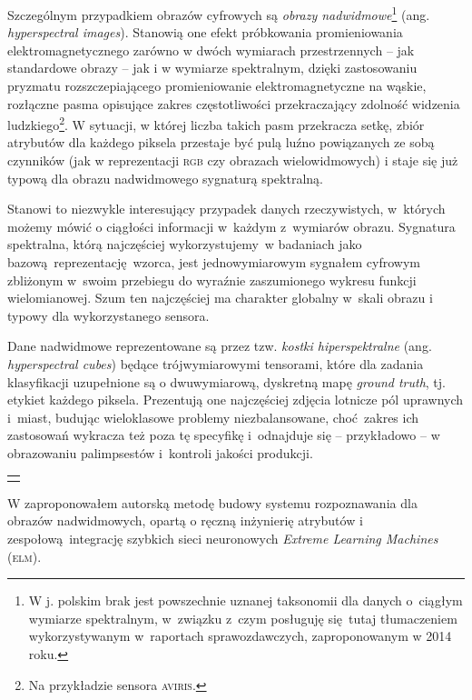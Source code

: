 Szczególnym przypadkiem obrazów cyfrowych są \emph{obrazy nadwidmowe}\footnote{W j. polskim brak jest powszechnie uznanej taksonomii dla danych o~ciągłym wymiarze spektralnym, w~związku z~czym posługuję się tutaj tłumaczeniem wykorzystywanym w~raportach sprawozdawczych, zaproponowanym w 2014 roku.} (ang. \emph{hyperspectral images}). Stanowią one efekt próbkowania promieniowania elektromagnetycznego zarówno w dwóch wymiarach przestrzennych -- jak standardowe obrazy -- jak i w wymiarze spektralnym, dzięki zastosowaniu pryzmatu rozszczepiającego promieniowanie elektromagnetyczne na wąskie, rozłączne pasma opisujące zakres częstotliwości przekraczający zdolność widzenia ludzkiego\footnote{Na przykładzie sensora \textsc{aviris}.}. W sytuacji, w której liczba takich pasm przekracza setkę, zbiór atrybutów dla każdego piksela przestaje być pulą luźno powiązanych ze sobą czynników (jak w reprezentacji \textsc{rgb} czy obrazach wielowidmowych) i staje się już typową dla obrazu nadwidmowego sygnaturą spektralną.

Stanowi to niezwykle interesujący przypadek danych rzeczywistych, w~których możemy mówić o ciągłości informacji w~każdym z~wymiarów obrazu. Sygnatura spektralna, którą najczęściej wykorzystujemy~w badaniach jako bazową reprezentację wzorca, jest jednowymiarowym sygnałem cyfrowym zbliżonym w~swoim przebiegu do wyraźnie zaszumionego wykresu funkcji wielomianowej. Szum ten najczęściej ma charakter globalny w~skali obrazu i typowy dla wykorzystanego sensora.

Dane nadwidmowe reprezentowane są przez tzw. \emph{kostki hiperspektralne} (ang. \emph{hyperspectral cubes}) będące trójwymiarowymi tensorami, które dla zadania klasyfikacji uzupełnione są o dwuwymiarową, dyskretną mapę \emph{ground truth}, tj. etykiet każdego piksela. Prezentują one najczęściej zdjęcia lotnicze pól uprawnych i~miast, budując wieloklasowe problemy niezbalansowane, choć zakres ich zastosowań wykracza też poza tę specyfikę i~odnajduje się -- przykładowo -- w obrazowaniu palimpsestów i~kontroli jakości produkcji.\vspace{1em}

{
\color{red}
\noindent\begin{tabular}{p{\textwidth}}
	\toprule &
\end{tabular}\vspace{-1em}
}
\noindent W  zaproponowałem autorską metodę budowy systemu rozpoznawania dla obrazów nadwidmowych, opartą o ręczną inżynierię atrybutów i zespołową integrację szybkich sieci neuronowych \emph{Extreme Learning Machines} (\textsc{elm}).

